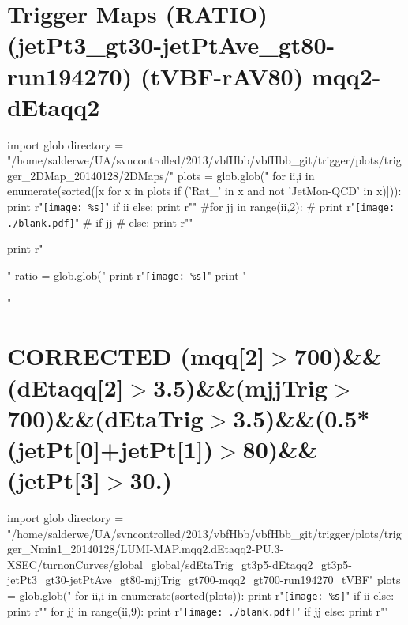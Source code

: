 \documentclass[12pt,english,dvipsnames]{beamer}
\newcommand{\UAoverlay}[0]{%
\begin{tikzpicture}[remember picture,overlay,shift={(current page.north east)}]
\node (zero) at (-1.8cm,-0.93cm) {\texttt{[image: ../logos/CMS.pdf]}\hspace{0.15cm}\texttt{[image: ../logos/CERN.pdf]}\hspace{0.15cm}\texttt{[image: ../logos/UA.pdf]}}; 
\end{tikzpicture}
}
\begin{document}
\section{Trigger Maps (RATIO) (jetPt3\_gt30-jetPtAve\_gt80-run194270) (tVBF-rAV80) mqq2-dEtaqq2}
\begin{frame}[t,fragile]%
\begin{python}
import glob
directory = "/home/salderwe/UA/svncontrolled/2013/vbfHbb/vbfHbb_git/trigger/plots/trigger_2DMap_20140128/2DMaps/"
plots = glob.glob("%
for ii,i in enumerate(sorted([x for x in plots if ('Rat_' in x and not 'JetMon-QCD' in x)])):
  print r"\texttt{[image: \%s]}"%
  if ii%
  else: print r"\hfill"
#for jj in range(ii,2):
#  print r"\texttt{[image: ./blank.pdf]}"
#  if jj%
#  else: print r"\hfill"
  
print r"\begin{minipage}{0.9999\textwidth}\centering"
ratio = glob.glob("%
print r"\texttt{[image: \%s]}"%
print "\end{minipage}"
\end{python} 
\end{frame}

\section{\tiny CORRECTED (mqq[2]$>$700)\&\&(dEtaqq[2]$>$3.5)\&\&(mjjTrig$>$700)\&\&(dEtaTrig$>$3.5)\&\&(0.5*(jetPt[0]+jetPt[1])$>$80)\&\&(jetPt[3]$>$30.)}
\begin{frame}[t,fragile]%
\begin{python}
import glob
directory = "/home/salderwe/UA/svncontrolled/2013/vbfHbb/vbfHbb_git/trigger/plots/trigger_Nmin1_20140128/LUMI-MAP.mqq2.dEtaqq2-PU.3-XSEC/turnonCurves/global_global/sdEtaTrig_gt3p5-dEtaqq2_gt3p5-jetPt3_gt30-jetPtAve_gt80-mjjTrig_gt700-mqq2_gt700-run194270_tVBF"
plots = glob.glob("%
for ii,i in enumerate(sorted(plots)):
  print r"\texttt{[image: \%s]}"%
  if ii%
  else: print r"\hfill"
for jj in range(ii,9):
  print r"\texttt{[image: ./blank.pdf]}"
  if jj%
  else: print r"\hfill"
\end{python}

\end{frame}
\end{document}
